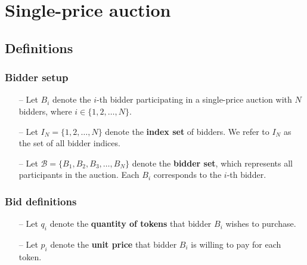 \section{Single-price auction}


\subsection{Definitions}

\subsubsection*{Bidder setup}
\begin{itemize}
    \setlength\itemsep{0em}
    \item[--] Let $B_i$ denote the $i$-th bidder participating in a single-price auction with $N$ bidders, where $i \in \{1, 2, \dots, N\}$.
    \item[--] Let $I_N = \{1, 2, \dots, N\}$ denote the \textbf{index set} of bidders. We refer to $I_N$ as the set of all bidder indices.
    \item[--] Let $\mathcal{B} = \{ B_1, B_2, B_3, \dots, B_N \}$ denote the \textbf{bidder set}, which represents all participants in the auction. Each $B_i$ corresponds to the $i$-th bidder.
\end{itemize}

\subsubsection*{Bid definitions}
\begin{itemize}
    \setlength\itemsep{0em}
    \item[--] Let $q_i$ denote the \textbf{quantity of tokens} that bidder $B_i$ wishes to purchase.
    \item[--] Let $p_i$ denote the \textbf{unit price} that bidder $B_i$ is willing to pay for each token.
\end{itemize}

